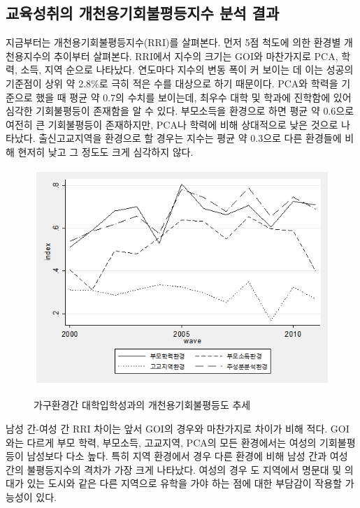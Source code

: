 \subsection{교육성취의 개천용기회불평등지수 분석 결과}
지금부터는 개천용기회불평등지수(RRI)를 살펴본다.
먼저 5점 척도에 의한 환경별 개천용지수의 추이부터 살펴본다.
 RRI에서 지수의 크기는 GOI와 마찬가지로 PCA, 학력, 소득, 지역 순으로 나타났다.
 연도마다 지수의 변동 폭이 커 보이는 데 이는 성공의 기준점이 상위 약 2.8\%로 극히 적은 수를 대상으로 하기 때문이다.
  PCA와 학력을 기준으로 했을 때 평균 약 0.7의 수치를 보이는데, 최우수 대학 및 학과에 진학함에 있어 심각한 기회불평등이 존재함을 알 수 있다.
  부모소득을 환경으로 하면 평균 약 0.6으로 여전히 큰 기회불평등이 존재하지만, PCA나 학력에 비해 상대적으로 낮은 것으로 나타났다.
  출신고교지역을 환경으로 할 경우는 지수는 평균 약 0.3으로 다른 환경들에 비해 현저히 낮고 그 정도도 크게 심각하지 않다.
 
\begin{figure}
    \centering
    \caption{가구환경간 대학입학성과의 개천용기회불평등도 추세}
    \includegraphics[width=\textwidth]{figure/goms_rri_byenv.png}
    \label{fig:goms_rri_byenv}
\end{figure}

남성 간-여성 간 RRI 차이는 앞서 GOI의 경우와 마찬가지로 차이가 비해 적다.
GOI와는 다르게 부모 학력, 부모소득, 고교지역, PCA의 모든 환경에서는 여성의 기회불평등이 남성보다 다소 높다.
특히 지역 환경에서 경우 다른 환경에 비해 남성 간과 여성 간의 불평등지수의 격차가 가장 크게 나타났다.
여성의 경우 도 지역에서 명문대 및 의대가 있는 도시와 같은 다른 지역으로 유학을 가야 하는 점에 대한 부담감이 작용할 가능성이 있다.


